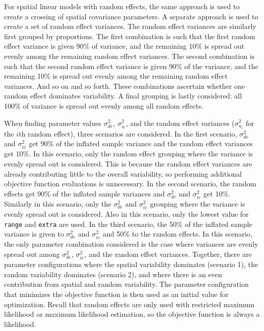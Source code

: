 \documentclass[10pt,letterpaper]{article}
\begin{document}
For spatial linear models with random effects, the same approach is used
to create a crossing of spatial covariance parameters. A separate
approach is used to create a set of random effect variances. The random
effect variances are similarly first grouped by proportions. The first
combination is such that the first random effect variance is given 90\%
of variance, and the remaining 10\% is spread out evenly among the
remaining random effect variances. The second combination is such that
the second random effect variance is given 90\% of the variance, and the
remaining 10\% is spread out evenly among the remaining random effect
variances. And so on and so forth. These combinations ascertain whether
one random effect dominates variability. A final grouping is lastly
considered: all 100\% of variance is spread out evenly among all random
effects.

When finding parameter values \(\sigma^2_{de}\), \(\sigma^2_{ie}\), and
the random effect variances (\(\sigma^2_{u_i}\) for the \(i\)th random
effect), three scenarios are considered. In the first scenario,
\(\sigma^2_{de}\) and \(\sigma^2_{ie}\) get 90\% of the inflated sample
variance and the random effect variances get 10\%. In this scenario,
only the random effect grouping where the variance is evenly spread out
is considered. This is because the random effect variances are already
contributing little to the overall variability, so performing additional
objective function evaluations is unnecessary. In the second scenario,
the random effects get 90\% of the inflated sample variances and
\(\sigma^2_{de}\) and \(\sigma^2_{ie}\) get 10\%. Similarly in this
scenario, only the \(\sigma^2_{de}\) and \(\sigma^2_{ie}\) grouping
where the variance is evenly spread out is considered. Also in this
scenario, only the lowest value for \texttt{range} and \texttt{extra}
are used. In the third scenario, the 50\% of the inflated sample
variance is given to \(\sigma^2_{de}\) and \(\sigma^2_{ie}\) and 50\% to
the random effects. In this scenario, the only parameter combination
considered is the case where variances are evenly spread out among
\(\sigma^2_{de}\), \(\sigma^2_{ie}\), and the random effect variances.
Together, there are parameter configurations where the spatial
variability dominates (scenario 1), the random variability dominates
(scenario 2), and where there is an even contribution from spatial and
random variability. The parameter configuration that minimizes the
objective function is then used as an initial value for optimization.
Recall that random effects are only used with restricted maximum
likelihood or maximum likelihood estimation, so the objective function
is always a likelihood.
\end{document}
